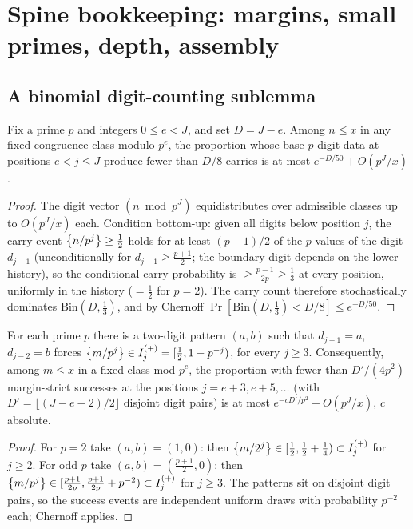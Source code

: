 \section{Spine bookkeeping: margins, small primes, depth, assembly}
\label{sec:bookkeeping}

\subsection{A binomial digit-counting sublemma}

\begin{lemma}\label{lem:fewcarries}
\statusP\quad
Fix a prime $p$ and integers $0\le e<J$, and set $D=J-e$. Among $n\le x$
in any fixed congruence class modulo $p^{e}$, the proportion whose
base-$p$ digit data at positions $e<j\le J$ produce fewer than $D/8$
carries is at most $e^{-D/50}+O(p^{J}/x)$.
\end{lemma}

\begin{proof}
The digit vector $(n\bmod p^{J})$ equidistributes over admissible
classes up to $O(p^{J}/x)$ each. Condition bottom-up: given all digits
below position $j$, the carry event $\left\{n/p^{j}\right\}\ge\tfrac12$ holds for
at least $(p-1)/2$ of the $p$ values of the digit $d_{j-1}$
(unconditionally for $d_{j-1}\ge\tfrac{p+1}2$; the boundary digit
depends on the lower history), so the conditional carry probability is
$\ge\tfrac{p-1}{2p}\ge\tfrac13$ at every position, uniformly in the
history ($=\tfrac12$ for $p=2$). The carry count therefore
stochastically dominates $\mathrm{Bin}(D,\tfrac13)$, and by Chernoff
$\Pr[\mathrm{Bin}(D,\tfrac13)<D/8]\le e^{-D/50}$.
\end{proof}

\begin{lemma}\label{lem:marginwins}
\statusP\quad
For each prime $p$ there is a two-digit pattern $(a,b)$ such that
$d_{j-1}=a$, $d_{j-2}=b$ forces $\left\{m/p^{j}\right\}\in
I^{(+)}_j=[\tfrac12,1-p^{-j})$, for every $j\ge3$. Consequently, among
$m\le x$ in a fixed class mod $p^{e}$, the proportion with fewer than
$D'/(4p^{2})$ margin-strict successes at the positions
$j=e+3,e+5,\ldots$ (with $D'=\lfloor(J-e-2)/2\rfloor$ disjoint digit
pairs) is at most $e^{-cD'/p^{2}}+O(p^{J}/x)$, $c$ absolute.
\end{lemma}

\begin{proof}
For $p=2$ take $(a,b)=(1,0)$: then
$\left\{m/2^{j}\right\}\in[\tfrac12,\tfrac12+\tfrac14)\subset I^{(+)}_j$ for
$j\ge2$. For odd $p$ take $(a,b)=(\tfrac{p+1}2,0)$: then
$\left\{m/p^{j}\right\}\in[\tfrac{p+1}{2p},\tfrac{p+1}{2p}+p^{-2})\subset
I^{(+)}_j$ for $j\ge3$. The patterns sit on disjoint digit pairs, so
the success events are independent uniform draws with probability
$p^{-2}$ each; Chernoff applies.
\end{proof}

